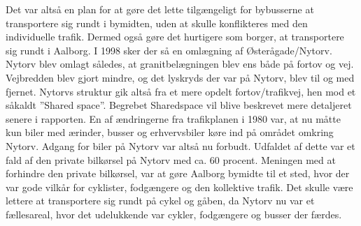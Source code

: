 Det var altså en plan for at gøre det lette tilgængeligt for bybusserne at transportere sig rundt i bymidten, uden at skulle konflikteres med den individuelle trafik. Dermed også gøre det hurtigere som borger, at transportere sig rundt i Aalborg.
I 1998 sker der så en omlægning af Østerågade/Nytorv.
Nytorv blev omlagt således, at granitbelægningen blev ens både på fortov og vej. Vejbredden blev gjort mindre, og det lyskryds der var på Nytorv, blev til og med fjernet. Nytorvs struktur gik altså fra et mere opdelt fortov/trafikvej, hen mod et såkaldt ”Shared space”. Begrebet Sharedspace vil blive beskrevet mere detaljeret senere i rapporten. En af ændringerne fra trafikplanen i 1980 var, at nu måtte kun biler med ærinder, busser og erhvervsbiler køre ind på området omkring Nytorv. Adgang for biler på Nytorv var altså nu forbudt. Udfaldet af dette var et fald af den private bilkørsel på Nytorv med ca. 60 procent.
Meningen med at forhindre den private bilkørsel, var at gøre Aalborg bymidte til et sted, hvor der var gode vilkår for cyklister, fodgængere og den kollektive trafik. Det skulle være lettere at transportere sig rundt på cykel og gåben, da Nytorv nu var et fællesareal, hvor det udelukkende var cykler, fodgængere og busser der færdes.
